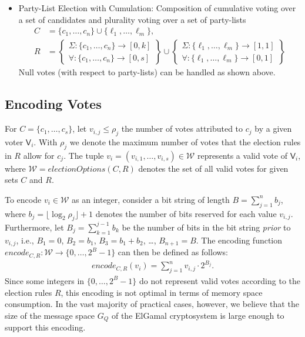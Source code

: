 \documentclass[bibtotoc,halfparskip,oneside]{scrreprt}
\newcommand{\Voter}[1]{\ensuremath{\mathsf{V}_{#1}}\xspace}
\begin{document}
\begin{itemize}
\item Party-List Election with Cumulation: Composition of cumulative voting over a set of candidates and plurality voting over a set of party-lists
\begin{align*}
	C&=\{c_1,\ldots,c_n\}\cup\{\ell_1,\ldots,\ell_m\},\\
	R&=\left\{\begin{aligned}\Sigma:\{c_1,\ldots,c_n\}\rightarrow[0,k] \\ \forall:\{c_1,\ldots,c_n\}\rightarrow[0,s]\end{aligned}\right\} \cup
	\left\{\begin{aligned}\Sigma:\{\ell_1,\ldots,\ell_m\}\rightarrow[1,1] \\ \forall:\{\ell_1,\ldots,\ell_m\}\rightarrow[0,1]\end{aligned}\right\}
\end{align*}
Null votes (with respect to party-lists) can be handled as shown above.
\end{itemize}


\subsection{Encoding Votes}\label{votes}

For $C=\{c_1,\ldots,c_s\}$, let $v_{i,j}\leq \rho_j$ the number of votes attributed to $c_j$ by a given voter $\Voter{i}$. With $\rho_j$ we denote the maximum number of votes that the election rules in $R$ allow for $c_j$. The tuple $v_i=(v_{i,1},\ldots,v_{i,s})\in\mathcal{W}$ represents a valid vote of \Voter{i}, where $\mathcal{W}=\mathit{electionOptions}(C,R)$ denotes the set of all valid votes for given sets $C$ and $R$.

To encode $v_i\in \mathcal{W}$ as an integer, consider a bit string of length $B=\sum_{j=1}^n b_j$, where $b_j=\lfloor\log_2\rho_j\rfloor+1$ denotes the number of bits reserved for each value $v_{i,j}$. Furthermore, let $B_j=\sum_{k=1}^{j-1}b_k$ be the number of bits in the bit string \emph{prior} to $v_{i,j}$, i.e., $B_1=0$, $B_2=b_1$, $B_3=b_1+b_2$, \ldots, $B_{n+1}=B$. The encoding function $\mathit{encode}_{C,R}:\mathcal{W}\rightarrow \{0,\ldots,2^B{-}1\}$ can then be defined as follows:
\begin{align*}
	\mathit{encode}_{C,R}(v_i) = \sum_{j=1}^n v_{i,j}\cdot 2^{B_j}.
\end{align*}
Since some integers in $\{0,\ldots,2^B{-}1\}$ do not represent valid votes according to the election rules $R$, this encoding is not optimal in terms of memory space consumption. In the vast majority of practical cases, however, we believe that the size of the message space $G_Q$ of the ElGamal cryptosystem is large enough to support this encoding.
\end{document}
